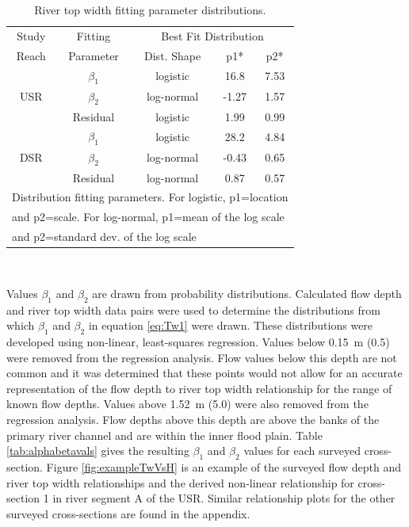 \begin{table}[htbp]
	\centering
	\caption[River top width fitting parameter distributions.]{River top width fitting parameter distributions.}
	\label{tab:TwFitting}
	\begin{tabular}{ccccc}
		\toprule
		Study                & Fitting   & \multicolumn{3}{c}{Best Fit Distribution} \\ \cmidrule(r{.5em}l){3-5}
		Reach                & Parameter & Dist. Shape      & p1*        & p2*       \\
		\toprule
		\multirow{3}{*}{USR} & $\beta_1$ & logistic         & 16.8       & 7.53      \\
		& $\beta_2$ & log-normal       & -1.27      & 1.57      \\
		& Residual  & logistic         & 1.99       & 0.99      \\
		\midrule
		\multirow{3}{*}{DSR} & $\beta_1$ & logistic         & 28.2       & 4.84      \\
		& $\beta_2$ & log-normal       & -0.43      & 0.65      \\
		& Residual  & log-normal       & 0.87       & 0.57      \\
		\bottomrule
		\multicolumn{5}{l}{{\footnotesize * Distribution fitting parameters.  For logistic, p1=location }}\\
		\multicolumn{5}{l}{\footnotesize{and p2=scale.  For log-normal, p1=mean of the log scale }}\\
		\multicolumn{5}{l}{\footnotesize{and p2=standard dev. of the log scale}}\\
	\end{tabular}\\
\end{table}

Values $\beta_1$ and $\beta_2$ are drawn from probability distributions.  Calculated flow depth and river top width data pairs were used to determine the distributions from which $\beta_1$ and $\beta_2$ in equation \ref{eq:Tw1} were drawn.  These distributions were developed using non-linear, least-squares regression.  Values below \SI{0.15}{\meter} (\SI{0.5}{\foot}) were removed from the regression analysis.  Flow values below this depth are not common and it was determined that these points would not allow for an accurate representation of the flow depth to river top width relationship for the range of known flow depths.  Values above \SI{1.52}{\meter} (\SI{5.0}{\foot}) were also removed from the regression analysis.  Flow depths above this depth are above the banks of the primary river channel and are within the inner flood plain.  Table \ref{tab:alphabetavals} gives the resulting $\beta_1$ and $\beta_2$ values for each surveyed cross-section.  Figure \ref{fig:exampleTwVsH} is an example of the surveyed flow depth and river top width relationships and the derived non-linear relationship for cross-section 1 in river segment A of the USR.  Similar relationship plots for the other surveyed cross-sections are found in the appendix. 

